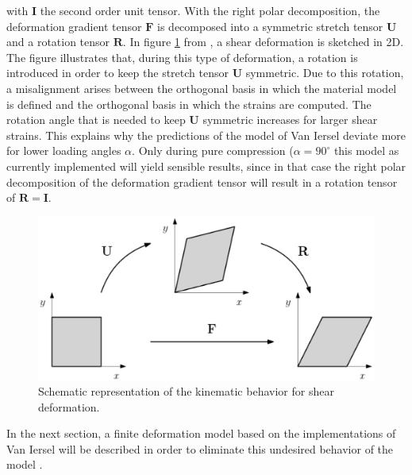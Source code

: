 with $\boldsymbol{I}$ the second order unit tensor. With the right polar decomposition, the deformation gradient tensor $\boldsymbol{F}$ is decomposed into a symmetric stretch tensor $\boldsymbol{U}$ and a rotation tensor $\boldsymbol{R}$. In figure \ref{Ch2_right_polar_decomp} from \cite{DAP}, a shear deformation is sketched in 2D. The figure illustrates that, during this type of deformation, a rotation is introduced in order to keep the stretch tensor $\boldsymbol{U}$ symmetric. Due to this rotation, a misalignment arises between the orthogonal basis in which the material model is defined and the orthogonal basis in which the strains are computed. The rotation angle that is needed to keep $\boldsymbol{U}$ symmetric increases for larger shear strains. This explains why the predictions of the model of Van Iersel deviate more for lower loading angles $\alpha$. Only during pure compression ($\alpha = 90^{\circ}$ this model as currently implemented will yield sensible results, since in that case the right polar decomposition of the deformation gradient tensor will result in a rotation tensor of $\boldsymbol{R}=\boldsymbol{I}$.
\begin{figure}[H]
    \centering
    \includegraphics[width=0.9\linewidth]{./Images/Ch2/Ch2_right_polar_decomp.PNG}
    \caption{Schematic representation of the kinematic behavior for shear deformation.\cite{DAP}}
    \label{Ch2_right_polar_decomp}
\end{figure}
In the next section, a finite deformation model based on the implementations of Van Iersel will be described in order to eliminate this undesired behavior of the model . 

\label{Ch2_sec_improvements}
